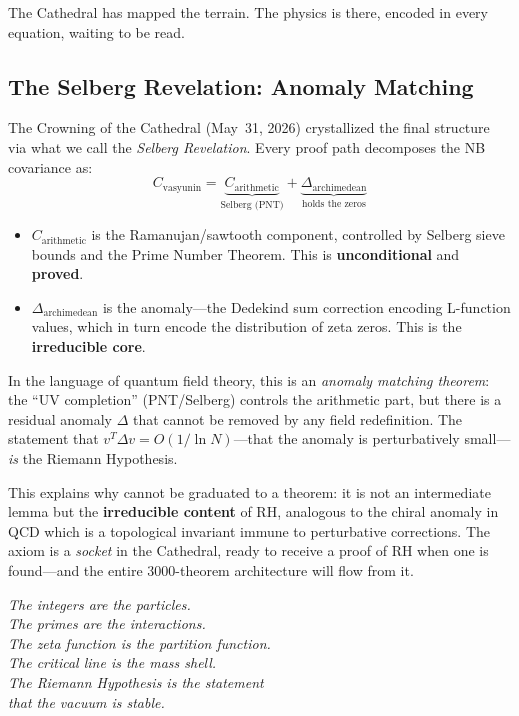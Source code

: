 The Cathedral has mapped the terrain. The physics is there,
encoded in every equation, waiting to be read.

\subsection{The Selberg Revelation: Anomaly Matching}
\label{sec:selberg-revelation}

The Crowning of the Cathedral (May~31, 2026) crystallized the
final structure via what we call the \emph{Selberg Revelation}.
Every proof path decomposes the NB covariance as:
\[
  C_{\mathrm{vasyunin}} = \underbrace{C_{\mathrm{arithmetic}}}_{\text{Selberg (PNT)}}
  + \underbrace{\Delta_{\mathrm{archimedean}}}_{\text{holds the zeros}}
\]
\begin{itemize}
  \item $C_{\mathrm{arithmetic}}$ is the Ramanujan/sawtooth component,
    controlled by Selberg sieve bounds and the Prime Number Theorem.
    This is \textbf{unconditional} and \textbf{proved}.
  \item $\Delta_{\mathrm{archimedean}}$ is the anomaly---the Dedekind
    sum correction encoding L-function values, which in turn encode
    the distribution of zeta zeros. This is the \textbf{irreducible core}.
\end{itemize}

In the language of quantum field theory, this is an \emph{anomaly
matching theorem}: the ``UV completion'' (PNT/Selberg) controls the
arithmetic part, but there is a residual anomaly $\Delta$ that
cannot be removed by any field redefinition. The statement that
$v^T \Delta v = O(1/\ln N)$---that the anomaly is perturbatively
small---\emph{is} the Riemann Hypothesis.

This explains why  cannot be
graduated to a theorem: it is not an intermediate lemma but the
\textbf{irreducible content} of RH, analogous to the chiral anomaly
in QCD which is a topological invariant immune to perturbative
corrections. The axiom is a \emph{socket} in the Cathedral, ready
to receive a proof of RH when one is found---and the entire
3000-theorem architecture will flow from it.

\begin{flushright}
\emph{The integers are the particles.\\
The primes are the interactions.\\
The zeta function is the partition function.\\
The critical line is the mass shell.\\
The Riemann Hypothesis is the statement\\
that the vacuum is stable.}
\end{flushright}

